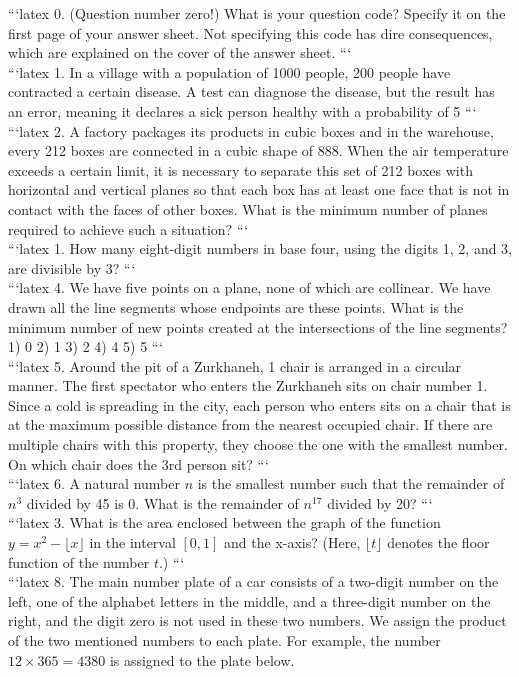 ```latex
0. (Question number zero!) What is your question code? Specify it on the first page of your answer sheet. Not specifying this code has dire consequences, which are explained on the cover of the answer sheet.
```
\\
```latex
1. In a village with a population of 1000 people, 200 people have contracted a certain disease. A test can diagnose the disease, but the result has an error, meaning it declares a sick person healthy with a probability of 5%
```
\\
```latex
2. A factory packages its products in cubic boxes and in the warehouse, every 212 boxes are connected in a cubic shape of 888. When the air temperature exceeds a certain limit, it is necessary to separate this set of 212 boxes with horizontal and vertical planes so that each box has at least one face that is not in contact with the faces of other boxes. What is the minimum number of planes required to achieve such a situation?
```
\\
```latex
1. How many eight-digit numbers in base four, using the digits 1, 2, and 3, are divisible by 3?
```
\\
```latex
4. We have five points on a plane, none of which are collinear. We have drawn all the line segments whose endpoints are these points. What is the minimum number of new points created at the intersections of the line segments? 
1) 0 2) 1 3) 2 4) 4 5) 5
```
\\
```latex
5. Around the pit of a Zurkhaneh, 1 chair is arranged in a circular manner. The first spectator who enters the Zurkhaneh sits on chair number 1. Since a cold is spreading in the city, each person who enters sits on a chair that is at the maximum possible distance from the nearest occupied chair. If there are multiple chairs with this property, they choose the one with the smallest number. On which chair does the 3rd person sit?
```
\\
```latex
6. A natural number $n$ is the smallest number such that the remainder of $n^3$ divided by 45 is 0. What is the remainder of $n^{17}$ divided by 20?
```
\\
```latex
3. What is the area enclosed between the graph of the function $y = x^2 - \lfloor x \rfloor$ in the interval $[0, 1]$ and the x-axis? (Here, $\lfloor t \rfloor$ denotes the floor function of the number $t$.)
```
\\
```latex
8. The main number plate of a car consists of a two-digit number on the left, one of the alphabet letters in the middle, and a three-digit number on the right, and the digit zero is not used in these two numbers. We assign the product of the two mentioned numbers to each plate. For example, the number $12 \times 365 = 4380$ is assigned to the plate below.

